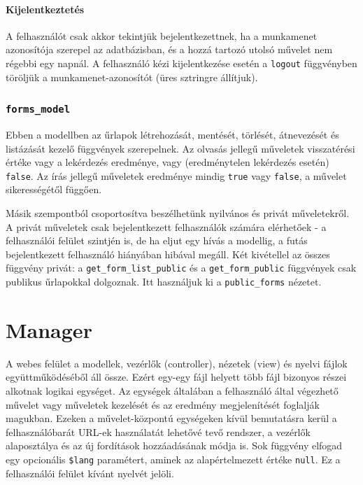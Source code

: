 \documentclass[12pt,a4paper,twoside]{article}
\begin{document}
\paragraph{Kijelentkeztetés}
A felhasználót csak akkor tekintjük bejelentkezettnek, ha a
munkamenet azonosítója szerepel az adatbázisban, és a hozzá tartozó utolsó
művelet nem régebbi egy napnál. A felhasználó kézi kijelentkezése esetén a
\texttt{logout} függvényben töröljük a munkamenet-azonosítót (üres sztringre
állítjuk).


\subsubsection{\texttt{forms\_model}}

Ebben a modellben az űrlapok létrehozását, mentését, törlését, átnevezését és
listázását kezelő függvények szerepelnek. Az olvasás jellegű műveletek
visszatérési értéke vagy a lekérdezés eredménye, vagy (eredménytelen lekérdezés
esetén) \texttt{false}. Az írás jellegű műveletek eredménye mindig \texttt{true}
vagy \texttt{false}, a művelet sikerességétől függően.

Másik szempontból csoportosítva beszélhetünk nyilvános és privát műveletekről. A
privát műveletek csak bejelentkezett felhasználók számára elérhetőek - a
felhasználói felület szintjén is, de ha eljut egy hívás a modellig,
a futás bejelentkezett felhasználó hiányában hibával megáll. Két kivétellel az
összes függvény privát: a \texttt{get\_form\_list\_public} és a
\texttt{get\_form\_public} függvények csak publikus űrlapokkal dolgoznak. Itt
használjuk ki a \texttt{public\_forms} nézetet.


\section{Manager}

A webes felület a modellek, vezérlők (controller), nézetek (view) és nyelvi fájlok
együttműködéséből áll össze. Ezért egy-egy fájl helyett több fájl bizonyos
részei alkotnak logikai egységet. Az egységek általában a felhasználó által
végezhető művelet vagy műveletek kezelését és az eredmény megjelenítését foglalják
magukban. Ezeken a művelet-központú egységeken kívül bemutatásra kerül a
felhasználóbarát URL-ek használatát lehetővé tevő rendszer, a vezérlők alaposztálya
és az új fordítások hozzáadásának módja is. Sok függvény elfogad egy opcionális
\texttt{\$lang} paramétert, aminek az alapértelmezett értéke \texttt{null}. Ez a
felhasználói felület kívánt nyelvét jelöli.
\end{document}
